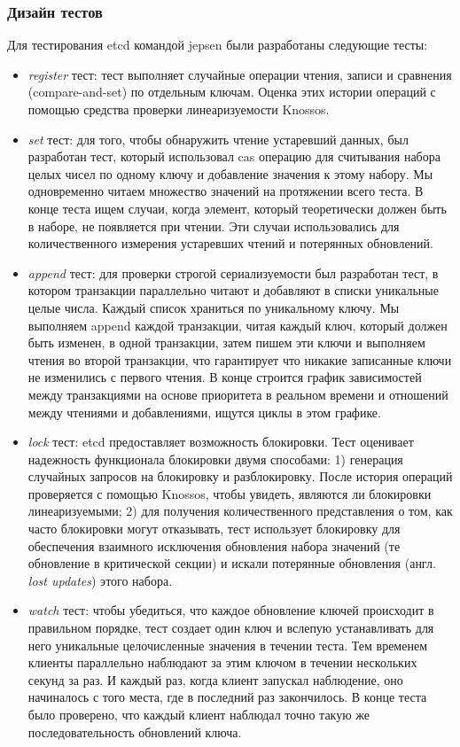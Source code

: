 \documentclass[12pt,  openany]{book}
\begin{document}
\subsubsection{Дизайн тестов}
Для тестирования etcd командой jepsen были разработаны следующие тесты: 
\begin{itemize}
\item \textit{register} тест:  тест выполняет случайные операции чтения, записи и сравнения (compare-and-set) по отдельным ключам. Оценка этих истории операций с помощью средства проверки линеаризуемости Knossos. 
\item \textit{set} тест:  для того, чтобы обнаружить чтение устаревший данных, был разработан тест, который использовал cas  операцию для считывания набора целых чисел по одному ключу и добавление значения к этому набору. Мы одновременно читаем множество значений на протяжении всего теста. В конце теста ищем случаи, когда элемент, который теоретически должен быть в наборе, не появляется при чтении. Эти случаи использовались для количественного измерения устаревших чтений и потерянных обновлений. 
\item \textit{append} тест: для проверки строгой сериализуемости был разработан тест, в котором транзакции параллельно читают и добавляют в списки уникальные целые числа. Каждый список храниться по уникальному ключу.  Мы выполняем append каждой транзакции, читая каждый ключ, который должен быть изменен, в одной транзакции, затем пишем эти ключи и выполняем чтения во второй транзакции, что гарантирует что никакие записанные ключи не изменились с первого чтения. В конце строится график зависимостей между транзакциями на основе приоритета в реальном времени и отношений между чтениями и добавлениями, ищутся циклы в этом графике. 
\item \textit{lock} тест: etcd предоставляет возможность блокировки. Тест оценивает надежность функционала блокировки двумя способами: 1) генерация случайных запросов на блокировку и разблокировку. После история операций проверяется с помощью Knossos, чтобы увидеть, являются ли блокировки линеаризуемыми; 2) для получения количественного представления о том, как часто блокировки могут отказывать, тест использует блокировку для обеспечения взаимного исключения обновления набора значений (те обновление в критической секции) и искали потерянные обновления (англ. \textit{lost updates})  этого набора. 
\item \textit{watch} тест: чтобы убедиться, что каждое обновление ключей происходит в правильном порядке, тест создает один ключ и вслепую устанавливать для него уникальные целочисленные значения в течении теста. Тем временем клиенты параллельно наблюдают за этим ключом в течении нескольких секунд за раз. И каждый раз, когда клиент запускал наблюдение, оно начиналось с того места, где в последний раз закончилось. В конце теста было проверено, что каждый клиент наблюдал точно такую же последовательность обновлений ключа. 
\end{itemize}
\end{document}
